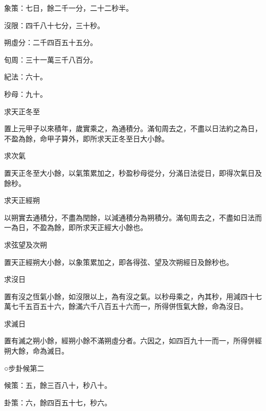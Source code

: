 \begin{pinyinscope}
 象策：七日，餘二千一分，二十二秒半。



 沒限：四千八十七分，三十秒。



 朔虛分：二千四百五十五分。



 旬周：三十一萬三千八百分。



 紀法：六十。



 秒母：九十。



 求天正冬至



 置上元甲子以來積年，歲實乘之，為通積分。滿旬周去之，不盡以日法約之為日，不盈為餘，命甲子算外，即所求天正冬至日大小餘。



 求次氣



 置天正冬至大小餘，以氣策累加之，秒盈秒母從分，分滿日法從日，即得次氣日及餘秒。



 求天正經朔



 以朔實去通積分，不盡為閏餘，以減通積分為朔積分。滿旬周去之，不盡如日法而一為日，不盈為餘，即所求天正經大小餘也。



 求弦望及次朔



 置天正經朔大小餘，以象策累加之，即各得弦、望及次朔經日及餘秒也。



 求沒日



 置有沒之恆氣小餘，如沒限以上，為有沒之氣。以秒母乘之，內其秒，用減四十七萬七千五百五十六，餘滿六千八百五十六而一，所得併恆氣大餘，命為沒日。



 求滅日



 置有滅之朔小餘，經朔小餘不滿朔虛分者。六因之，如四百九十一而一，所得併經朔大餘，命為滅日。



 ○步卦候第二



 候策：五，餘三百八十，秒八十。



 卦策：六，餘四百五十七，秒六。




\end{pinyinscope}
